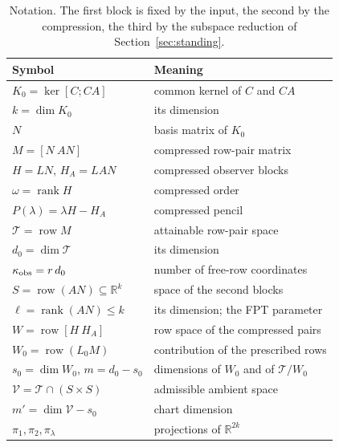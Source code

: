 ﻿\documentclass[journal]{IEEEtran}
\theoremstyle{plainn}
\theoremstyle{remark}
\begin{document}
\begin{table}[!t]
\centering
\caption{Notation. The first block is fixed by the input, the second by the compression, the third by
the subspace reduction of Section~\ref{sec:standing}.}
\label{tab:notation}
\footnotesize
\begin{tabular}{@{}ll@{}}
\toprule
Symbol & Meaning \\
\midrule
$K_0=\ker[C;CA]$ & common kernel of $C$ and $CA$ \\
$k=\dim K_0$ & its dimension \\
$N$ & basis matrix of $K_0$ \\
$M=[N\ AN]$ & compressed row-pair matrix \\
\midrule
$H=LN$, $H_A=LAN$ & compressed observer blocks \\
$\omega=\operatorname{rank}H$ & compressed order \\
$P(\lambda)=\lambda H-H_A$ & compressed pencil \\
\midrule
$\mathcal T=\operatorname{row}M$ & attainable row-pair space \\
$d_0=\dim\mathcal T$ & its dimension \\
$\kappa_{\rm obs}=r\,d_0$ & number of free-row coordinates \\
$S=\operatorname{row}(AN)\subseteq\mathbb R^k$ & space of the second blocks \\
$\ell=\operatorname{rank}(AN)\le k$ & its dimension; the FPT parameter \\
$W=\operatorname{row}[H\ H_A]$ & row space of the compressed pairs \\
$W_0=\operatorname{row}(L_0M)$ & contribution of the prescribed rows \\
$s_0=\dim W_0$, $m=d_0-s_0$ & dimensions of $W_0$ and of $\mathcal T/W_0$ \\
$\mathcal V=\mathcal T\cap(S\times S)$ & admissible ambient space \\
$m'=\dim\mathcal V-s_0$ & chart dimension \\
$\pi_1,\pi_2,\pi_\lambda$ & projections of $\mathbb R^{2k}$ \\
\bottomrule
\end{tabular}
\end{table}
\end{document}
